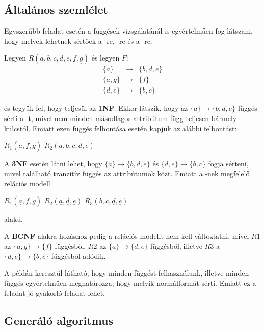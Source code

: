 \subsection{Általános szemlélet}
Egyszerűbb feladat esetén a függések vizsgálatánál is egyértelműen fog látszani, hogy melyek lehetnek sértőek a \nfk-re, \nfh-re és a \BCNF-re.
\begin{pld}
    Legyen $R(\underline{a},b,c,d,e,f,\underline{g})$ és legyen $F$:
    $$
    \begin{matrix}
    \{a\} & \longrightarrow & \{b,d,e\}\\
    \{a,g\} & \longrightarrow &  \{f\} \\
    \{d,e\}  & \longrightarrow & \{b,c\}
    \end{matrix}
    $$
    
    és tegyük fel, hogy teljesül az \textbf{1NF}. Ekkor látszik, hogy az $\{a\} \rightarrow \{b,d,e\}$ függés sérti a \nfk-t, mivel nem minden másodlagos attribútum függ teljesen bármely kulcstól. Emiatt ezen függés felbontása esetén kapjuk az alábbi felbontást:
    \begin{center}
        $R_1(\underline{a},f,\underline{g})$ \break
        $R_2(\underline{a},b,c,d,e)$
    \end{center}
    A \textbf{3NF} esetén látni lehet, hogy $\{a\} \rightarrow \{b,d,e\}$ és $\{d,e\} \rightarrow \{b,c\}$ fogja sérteni, mivel található tranzitív függés az attribútumok közt. Emiatt a \nfh-nek megfelelő relációs modell
    \begin{center}
        $R_1(\underline{a},f,\underline{g})$ \break
        $R_2(\underline{a},\underline{d},\underline{e})$ \break
        $R_3(b,c,\underline{d},\underline{e})$
    \end{center}
    alakú. \par
    A \textbf{BCNF} alakra hozáshoz pedig a relációs modellt nem kell változtatni, mivel $R1$ az $\{a,g\} \rightarrow \{f\}$ függésből, $R2$ az $\{a\} \rightarrow \{d,e\}$ függésből, illetve $R3$ a $\{d,e\} \rightarrow \{b,c\}$ függésből adódik.
\end{pld}
A példán keresztül látható, hogy minden függést felhasználunk, illetve minden függés egyértelműen meghatározza, hogy melyik normálformát sérti. Emiatt ez a feladat jó gyakorló feladat lehet.

\subsection{Generáló algoritmus}


